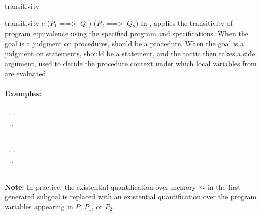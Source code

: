 \begin{tactic}{transitivity}
  \begin{tsyntax}{transitivity c ($P_1$ ==> $\ Q_1$) ($P_2$ ==> $\ Q_2$)}
  In \prhl, applies the transitivity of program equivalence using the
  specified program and specifications. When the goal is a judgment on
  procedures,  should be a procedure. When the goal is a
  judgment on statements,  should be a statement, and the
  tactic then takes a side argument, used to decide the procedure
  context under which local variables from  are evaluated.

  \paragraph{Examples:}\strut

  \begin{cmathpar}
    {\forall {}\ .\,    \Rightarrow
        \exists {}.\,   
                           \wedge {}   \\
     \forall {}\ \ .\,
           \Rightarrow
             \Rightarrow
             \\
      \\
     }
    {}

    {\forall {}\ .\,    \Rightarrow
        \exists {}.\,   
                           \wedge {}   \\
     \forall {}\ \ .\,
           \Rightarrow
             \Rightarrow
             \\
      \\
     }
    {}
  \end{cmathpar}

  \textbf{Note:} In practice, the existential quantification over
  memory $m$ in the first generated subgoal is replaced with an
  existential quantification over the program variables appearing in $P$,
  $P_1$, or $P_2$.
  \end{tsyntax}
\end{tactic}
